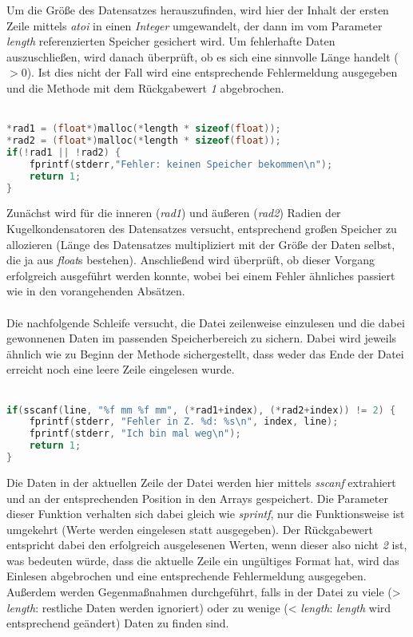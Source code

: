 \documentclass[11pt]{scrartcl}
\begin{document}
Um die Größe des Datensatzes herauszufinden, wird hier der Inhalt der ersten Zeile mittels \emph{atoi} in einen \emph{Integer} umgewandelt, der dann im vom Parameter \emph{length} referenzierten Speicher gesichert wird. Um fehlerhafte Daten auszuschließen, wird danach überprüft, ob es sich eine sinnvolle Länge handelt ($>0$). Ist dies nicht der Fall wird eine entsprechende Fehlermeldung ausgegeben und die Methode mit dem Rückgabewert \emph{1} abgebrochen.
\\\\
\begin{lstlisting}[language=C]
*rad1 = (float*)malloc(*length * sizeof(float));
*rad2 = (float*)malloc(*length * sizeof(float));
if(!rad1 || !rad2) {
	fprintf(stderr,"Fehler: keinen Speicher bekommen\n");
	return 1;
}
\end{lstlisting}
Zunächst wird für die inneren (\emph{rad1}) und äußeren (\emph{rad2}) Radien der Kugelkondensatoren des Datensatzes versucht, entsprechend großen Speicher zu allozieren (Länge des Datensatzes multipliziert mit der Größe der Daten selbst, die ja aus \emph{float}s bestehen). Anschließend wird überprüft, ob dieser Vorgang erfolgreich ausgeführt werden konnte, wobei bei einem Fehler ähnliches passiert wie in den vorangehenden Absätzen.
\\\\
Die nachfolgende Schleife versucht, die Datei zeilenweise einzulesen und die dabei gewonnenen Daten im passenden Speicherbereich zu sichern. Dabei wird jeweils ähnlich wie zu Beginn der Methode sichergestellt, dass weder das Ende der Datei erreicht noch eine leere Zeile eingelesen wurde.
\\\\
\begin{lstlisting}[language=C]
if(sscanf(line, "%f mm %f mm", (*rad1+index), (*rad2+index)) != 2) {
	fprintf(stderr, "Fehler in Z. %d: %s\n", index, line);
	fprintf(stderr, "Ich bin mal weg\n");
	return 1;
}
\end{lstlisting}
Die Daten in der aktuellen Zeile der Datei werden hier mittels \emph{sscanf} extrahiert und an der entsprechenden Position in den Arrays gespeichert. Die Parameter dieser Funktion verhalten sich dabei gleich wie \emph{sprintf}, nur die Funktionsweise ist umgekehrt (Werte werden eingelesen statt ausgegeben). Der Rückgabewert entspricht dabei den erfolgreich ausgelesenen Werten, wenn dieser also nicht \emph{2} ist, was bedeuten würde, dass die aktuelle Zeile ein ungültiges Format hat, wird das Einlesen abgebrochen und eine entsprechende Fehlermeldung ausgegeben. Außerdem werden Gegenmaßnahmen durchgeführt, falls in der Datei zu viele (> \emph{length}: restliche Daten werden ignoriert) oder zu wenige (< \emph{length}: \emph{length} wird entsprechend geändert) Daten zu finden sind.
\end{document}
